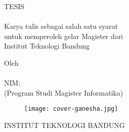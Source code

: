 
\begin{spacing}{1}
\begin{center}
    \smallskip
    \thispagestyle{empty}
    \large \bfseries \MakeUppercase{\Title}

    \vfill\vfill

    \large TESIS\\
    \hfill\\
    \normalsize Karya tulis sebagai salah satu syarat\\
    untuk memperoleh gelar Magister dari\\
    Institut Teknologi Bandung

    \vfill

    \normalsize Oleh\\
    \large \MakeUppercase{\AuthorName}\\
    NIM:~\uppercase{\AuthorNIM}\\
    (Program Studi Magister Informatika)

    \vfill
    
    \begin{figure}[h]
        \centering
      	\texttt{[image: cover-ganesha.jpg]}
    \end{figure}
    
    \vfill\vfill

    \large
    \uppercase{Institut Teknologi Bandung} \\
    \ThesisMonthYear
\end{center}
\end{spacing}